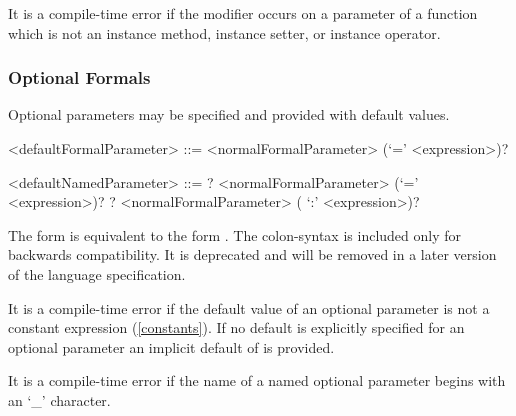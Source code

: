 \documentclass[makeidx]{article}
\begin{document}

\LMHash{}%
It is a compile-time error if the modifier \COVARIANT{} occurs on
a parameter of a function which is not
an instance method, instance setter, or instance operator.


\subsubsection{Optional Formals}

\LMHash{}%
Optional parameters may be specified and provided with default values.

\begin{grammar}
<defaultFormalParameter> ::= <normalFormalParameter> (`=' <expression>)?

<defaultNamedParameter> ::= \REQUIRED{}? <normalFormalParameter> (`=' <expression>)?
  \alt \REQUIRED{}? <normalFormalParameter> ( `:' <expression>)?
\end{grammar}

The form 
is equivalent to the form
.
The colon-syntax is included only for backwards compatibility.
It is deprecated and will be removed in a later version of the language specification.

\LMHash{}%
It is a compile-time error if the default value of an optional parameter is not a constant expression (\ref{constants}).
If no default is explicitly specified for an optional parameter an implicit default of \NULL{} is provided.

\LMHash{}%
It is a compile-time error if the name of a named optional parameter begins with an `_' character.

\end{document}
